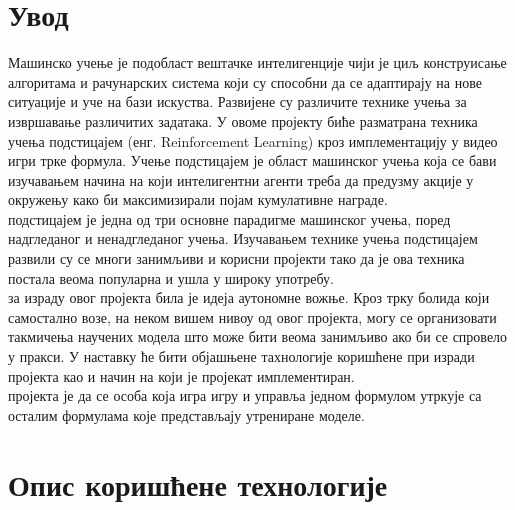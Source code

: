 \documentclass[12pt]{article}
\begin{document}
\tableofcontents
\newpage

\section{Увод}
\justifying
Машинско учење је подобласт вештачке интелигенције чији је циљ конструисање алгоритама и рачунарских система који су способни да  се адаптирају на нове ситуације и уче на бази искуства. Развијене су различите технике учења за извршавање различитих задатака. У овоме пројекту биће разматрана техника учења подстицајем (енг. Reinforcement Learning) кроз имплементацију у видео игри трке формула. Учење подстицајем је област машинског учења која се бави изучавањем начина на који интелигентни агенти треба да предузму акције у окружењу како би максимизирали појам кумулативне награде. \\
 подстицајем је једна од три основне парадигме машинског учења, поред надгледаног и ненадгледаног учења. Изучавањем технике учења подстицајем развили су се многи занимљиви и корисни пројекти тако да је ова техника постала веома популарна и ушла у широку употребу.\\ 
 за израду овог пројекта била је идеја аутономне вожње. Кроз трку болида који самостално возе, на неком вишем нивоу од овог пројекта, могу се организовати такмичења научених модела што може бити веома занимљиво ако би се спровело у пракси. У наставку ће бити објашњене тахнологије коришћене при изради пројекта као и начин на који је пројекат имплементиран.\\
 пројекта је да се особа која игра игру и управља једном формулом утркује са осталим формулама које представљају утрениране моделе. 

\newpage
\section{Опис коришћене технологије}
\end{document}
